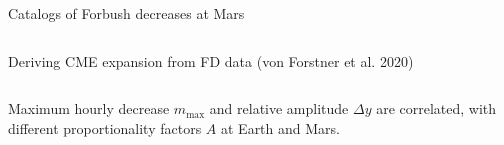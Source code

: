 \documentclass[10pt,aspectratio=169,usenames,dvipsnames]{beamer}
\newcommand{\summary}{\textcolor{mOrange}{\faArrowCircleRight}\;}
\begin{document}
\begin{frame}{Catalogs of Forbush decreases at Mars}
\begin{columns}
\begin{column}{0.35\textwidth}
{
            }
            
    	\end{column}
    \end{columns}
\end{frame}

\begin{frame}{Deriving CME expansion from FD data (von Forstner et al. 2020)}
    \begin{columns}
		\begin{column}{0.45\textwidth}
			\centering
			
		\end{column}
		\begin{column}{0.5\textwidth}
			\centering
			\scalebox{0.7}{}
		\end{column}
	\end{columns}
	\vskip-2mm
	\centering
	\summary Maximum hourly decrease $m_\text{max}$ and relative amplitude $\Delta y$ are correlated, with different proportionality factors $A$ at Earth and Mars.
\end{frame}
\end{document}
